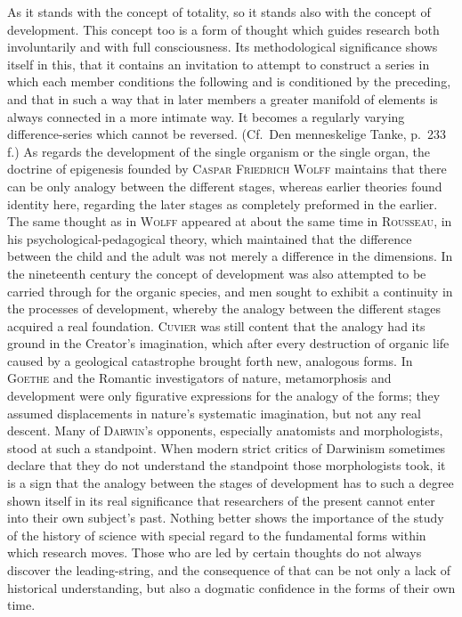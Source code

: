 \documentclass[12pt]{book}
\newcommand{\opage}[1]{\marginnote{\footnotesize\textit{[#1]}}}
\begin{document}
As it stands with the concept of totality, so it stands also with the concept of
development. This concept too is a form of thought which guides research both
involuntarily and with full consciousness. Its methodological significance shows
itself in this, that it contains an invitation to attempt to construct a series in
which each member conditions the following and is conditioned by the preceding,
and that in such a way that in later members a greater manifold of elements is
always connected in a more intimate way. It becomes a \opage{104}regularly varying
difference-series which cannot be reversed. (Cf.\ Den menneskelige Tanke, p.\ 233
f.) As regards the development of the single organism or the single organ, the
doctrine of epigenesis founded by \textsc{Caspar Friedrich Wolff} maintains that
there can be only analogy between the different stages, whereas earlier theories
found identity here, regarding the later stages as completely preformed in the
earlier. The same thought as in \textsc{Wolff} appeared at about the same time in
\textsc{Rousseau}, in his psychological-pedagogical theory, which maintained that
the difference between the child and the adult was not merely a difference in the
dimensions. In the nineteenth century the concept of development was also
attempted to be carried through for the organic species, and men sought to exhibit
a continuity in the processes of development, whereby the analogy between the
different stages acquired a real foundation. \textsc{Cuvier} was still content
that the analogy had its ground in the Creator's imagination, which after every
destruction of organic life caused by a geological catastrophe brought forth new,
analogous forms. In \textsc{Goethe} and the Romantic investigators of nature,
metamorphosis and development were only figurative expressions for the analogy of
the forms; they assumed displacements in nature's systematic imagination, but not
any real descent. Many of \textsc{Darwin}'s opponents, especially anatomists and
morphologists, stood at such a standpoint. When modern strict critics of Darwinism
sometimes declare that they do not understand the standpoint those morphologists
took, it is a sign that the analogy between the stages of development has to such
a degree shown itself in its real significance that researchers of the present
cannot enter into their own subject's past. Nothing better shows the importance of
the study of the history of science with special regard to the fundamental forms
within which \opage{105}research moves. Those who are led by certain thoughts do not always
discover the leading-string, and the consequence of that can be not only a lack of
historical understanding, but also a dogmatic confidence in the forms of their own
time.
\end{document}
